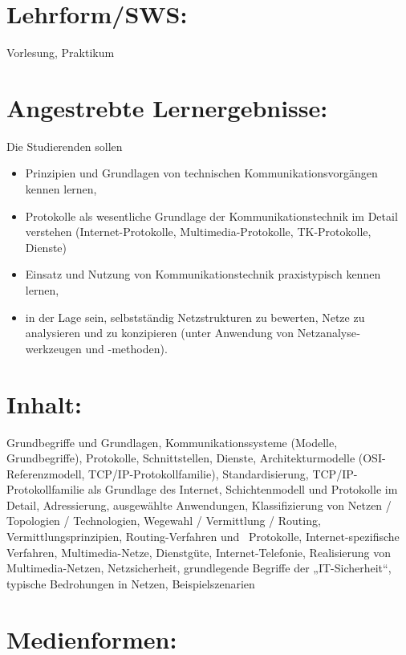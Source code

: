 \section*{Lehrform/SWS:}\label{lehrformsws-12}

Vorlesung, Praktikum

\section*{Angestrebte
Lernergebnisse:}\label{angestrebte-lernergebnisse-12}

Die Studierenden sollen

\begin{itemize}
\tightlist
\item
  Prinzipien und Grundlagen von technischen Kommunikations­vor­gängen
  kennen lernen,
\item
  Protokolle als wesentliche Grundlage der Kommunikationstechnik im
  Detail verstehen (Internet-Protokolle, Multimedia-Protokolle,
  TK-Protokolle, Dienste)
\item
  Einsatz und Nutzung von Kommunikations­tech­nik praxistypisch kennen
  lernen,
\item
  in der Lage sein, selbstständig Netzstrukturen zu bewerten, Netze zu
  analysieren und zu konzipieren (unter Anwendung von
  Netz­analyse­werkzeugen und -methoden).
\end{itemize}

\section*{Inhalt:}\label{inhalt-12}

Grundbegriffe und Grundlagen, Kommunikationssysteme (Modelle,
Grundbegriffe), Protokolle, Schnittstellen, Dienste, Architekturmodelle
(OSI-Referenzmodell, TCP/IP-Protokollfamilie), Standardisierung,
TCP/IP-Protokollfamilie als Grundlage des Internet, Schichtenmodell und
Protokolle im Detail, Adressierung, ausgewählte Anwendungen,
Klassifizierung von Netzen / Topologien / Technologien, Wegewahl /
Vermittlung / Routing, Vermittlungsprinzipien, Routing-Verfahren und~
Protokolle, Internet-spezifische Verfahren, Multimedia-Netze,
Dienstgüte, Internet-Telefonie, Realisierung von Multimedia-Netzen,
Netzsicherheit, grundlegende Begriffe der „IT-Sicherheit``, typische
Bedrohungen in Netzen, Beispielszenarien

\section*{Medienformen:}\label{medienformen-7}

